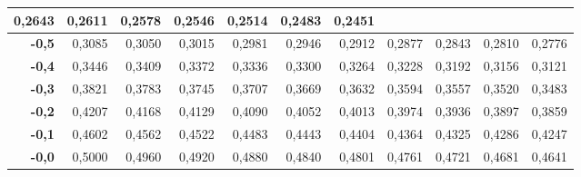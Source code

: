 \documentclass[a4paper]{article}
\begin{document}
\begin{center}
\begin{tabular}{|r||r|r|r|r|r|r|r|r|r|r|}
0,2643& 
0,2611& 
0,2578& 
0,2546& 
0,2514& 
0,2483& 
0,2451 \\
\hline
\textbf{-0,5}& 
0,3085& 
0,3050& 
0,3015& 
0,2981& 
0,2946& 
0,2912& 
0,2877& 
0,2843& 
0,2810& 
0,2776 \\
\hline
\textbf{-0,4}& 
0,3446& 
0,3409& 
0,3372& 
0,3336& 
0,3300& 
0,3264& 
0,3228& 
0,3192& 
0,3156& 
0,3121 \\
\hline
\textbf{-0,3}& 
0,3821& 
0,3783& 
0,3745& 
0,3707& 
0,3669& 
0,3632& 
0,3594& 
0,3557& 
0,3520& 
0,3483 \\
\hline
\textbf{-0,2}& 
0,4207& 
0,4168& 
0,4129& 
0,4090& 
0,4052& 
0,4013& 
0,3974& 
0,3936& 
0,3897& 
0,3859 \\
\hline
\textbf{-0,1}& 
0,4602& 
0,4562& 
0,4522& 
0,4483& 
0,4443& 
0,4404& 
0,4364& 
0,4325& 
0,4286& 
0,4247 \\
\hline
\textbf{-0,0}&
0,5000&
0,4960&
0,4920&
0,4880&
0,4840&
0,4801&
0,4761&
0,4721&
0,4681&
0,4641\\
\hline
\end{tabular}

\newpage


\end{center}
\end{document}
